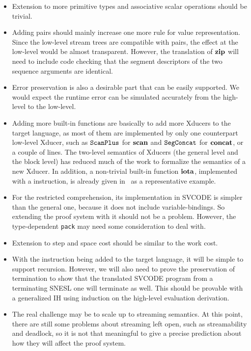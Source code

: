 \begin{itemize}
	\item Extension to more primitive types and associative scalar operations should be trivial.
	
	\item Adding pairs should mainly increase one more rule for value representation. Since the low-level stream trees are compatible with pairs, the effect at the low-level would be almost transparent. However, the translation of $\mathbf{zip}$ will need to include code checking that the segment descriptors of the two sequence arguments are identical.
	
	\item Error preservation is also a desirable part that can be easily supported. We would expect the runtime error can be simulated accurately from the high-level to the low-level.
		
	\item Adding more built-in functions are basically to add more Xducers to the target language, as most of them are implemented by only one counterpart low-level Xducer, such as $\mathtt{ScanPlus}_{}$ for $\mathbf{scan}$ and $\mathtt{SegConcat}$ for $\mathbf{concat}$, or a couple of lines.
	The two-level semantics of Xducers (the general level and the block level) has reduced much of the work to formalize the semantics of a new Xducer.
	In addition, a non-trivial built-in function $\mathbf{iota}$, implemented with a \wc instruction, is already given in \fmsnesl \  as a representative example.
 
	\item For the restricted comprehension, its implementation in SVCODE is simpler than the general one, because it does not include variable-bindings. So extending the proof system with it should not be a problem. However, the type-dependent \texttt{pack} may need some consideration to deal with. 
	
	\item Extension to step and space cost should be similar to the work cost. 
	
	
	\item With the \sc instruction being added to the target language, it will be simple to support recursion. However, we will also need to prove the preservation of termination to show that the translated SVCODE program from a terminating SNESL one will terminate as well. This should be provable with a generalized IH using induction on the high-level evaluation derivation. 
	
	
	\item The real challenge may be to scale up to streaming semantics. At this point, there are still some problems about streaming left open, such as streamability and deadlock, so it is not that meaningful to give a precise prediction about how they will affect the proof system.
	
	
\end{itemize}




